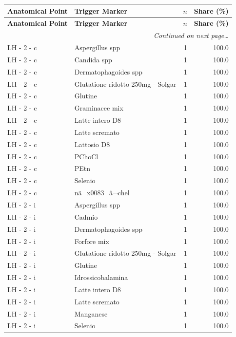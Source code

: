 \documentclass[a4paper,11pt]{article}
\begin{document}
\begin{footnotesize}
\begin{longtable}{p{3.5cm}p{7.5cm}rr}
\toprule
\textbf{Anatomical Point} &
\textbf{Trigger Marker} &
\textbf{$n$} &
\textbf{Share (\%)} \\
\midrule
\endfirsthead
\toprule
\textbf{Anatomical Point} &
\textbf{Trigger Marker} &
\textbf{$n$} &
\textbf{Share (\%)} \\
\midrule
\endhead
\midrule
\multicolumn{4}{r}{\footnotesize\emph{Continued on next page\ldots}} \\
\endfoot
\bottomrule
\endlastfoot
LH - 2 - c & Aspergillus spp & 1 & 100.0 \\
LH - 2 - c & Candida spp & 1 & 100.0 \\
LH - 2 - c & Dermatophagoides spp & 1 & 100.0 \\
LH - 2 - c & Glutatione ridotto 250mg - Solgar & 1 & 100.0 \\
LH - 2 - c & Glutine & 1 & 100.0 \\
LH - 2 - c & Graminacee mix & 1 & 100.0 \\
LH - 2 - c & Latte intero D8 & 1 & 100.0 \\
LH - 2 - c & Latte scremato & 1 & 100.0 \\
LH - 2 - c & Lattosio D8 & 1 & 100.0 \\
LH - 2 - c & PChoCl & 1 & 100.0 \\
LH - 2 - c & PEtn & 1 & 100.0 \\
LH - 2 - c & Selenio & 1 & 100.0 \\
LH - 2 - c & nã\_x0083\_â¬chel & 1 & 100.0 \\
LH - 2 - i & Aspergillus spp & 1 & 100.0 \\
LH - 2 - i & Cadmio & 1 & 100.0 \\
LH - 2 - i & Dermatophagoides spp & 1 & 100.0 \\
LH - 2 - i & Forfore mix & 1 & 100.0 \\
LH - 2 - i & Glutatione ridotto 250mg - Solgar & 1 & 100.0 \\
LH - 2 - i & Glutine & 1 & 100.0 \\
LH - 2 - i & Idrossicobalamina & 1 & 100.0 \\
LH - 2 - i & Latte intero D8 & 1 & 100.0 \\
LH - 2 - i & Latte scremato & 1 & 100.0 \\
LH - 2 - i & Manganese & 1 & 100.0 \\
LH - 2 - i & Selenio & 1 & 100.0 \\

\end{longtable}
\end{footnotesize}
\end{document}
